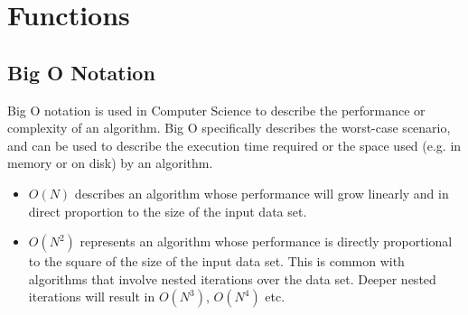 \documentclass[12pt]{report}
\begin{document}
\section*{Functions}

\subsection*{Big O Notation}
Big O notation is used in Computer Science to describe the performance or complexity of an algorithm. Big O specifically describes the worst-case scenario, and can be used to describe the execution time required or the space used (e.g. in memory or on disk) by an algorithm.

\begin{itemize}
\item $O(N)$ describes an algorithm whose performance will grow linearly and in direct proportion to the size of the input data set. 
\item $O(N^2)$ represents an algorithm whose performance is directly proportional to the square of the size of the input data set. This is common with algorithms that involve nested iterations over the data set. Deeper nested iterations will result in $O(N^3)$, $O(N^4)$ etc.
\end{itemize}
\end{document}
